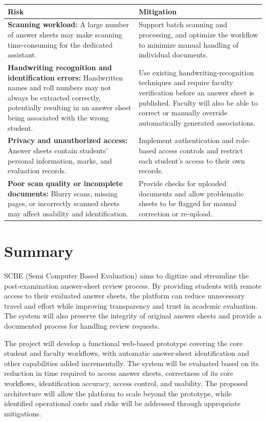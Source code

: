\documentclass[11pt,a4paper]{article}
\begin{document}
\renewcommand{\arraystretch}{2}
\begin{tabularx}{\textwidth}{@{}p{}X@{}}
\textbf{Risk} & \textbf{Mitigation} \\
\midrule
\textbf{Scanning workload:} A large number of answer sheets may make scanning time-consuming for the dedicated assistant.
&
Support batch scanning and processing, and optimize the workflow to minimize manual handling of individual documents.
\\[1.5em]

\textbf{Handwriting recognition and identification errors:} Handwritten names and roll numbers may not always be extracted correctly, potentially resulting in an answer sheet being associated with the wrong student.
&
Use existing handwriting-recognition techniques and require faculty verification before an answer sheet is published. Faculty will also be able to correct or manually override automatically generated associations.
\\[1.5em]

\textbf{Privacy and unauthorized access:} Answer sheets contain students' personal information, marks, and evaluation records.
&
Implement authentication and role-based access controls and restrict each student's access to their own records.
\\[1.5em]

\textbf{Poor scan quality or incomplete documents:} Blurry scans, missing pages, or incorrectly scanned sheets may affect usability and identification.
&
Provide checks for uploaded documents and allow problematic sheets to be flagged for manual correction or re-upload.
\\
\bottomrule
\end{tabularx}

\section{Summary}
SCBE (Semi Computer Based Evaluation) aims to digitize and streamline the post-examination answer-sheet review process. By providing students with remote access to their evaluated answer sheets, the platform can reduce unnecessary travel and effort while improving transparency and trust in academic evaluation. The system will also preserve the integrity of original answer sheets and provide a documented process for handling review requests.

The project will develop a functional web-based prototype covering the core student and faculty workflows, with automatic answer-sheet identification and other capabilities added incrementally. The system will be evaluated based on its reduction in time required to access answer sheets, correctness of its core workflows, identification accuracy, access control, and usability. The proposed architecture will allow the platform to scale beyond the prototype, while identified operational costs and risks will be addressed through appropriate mitigations.
\end{document}

